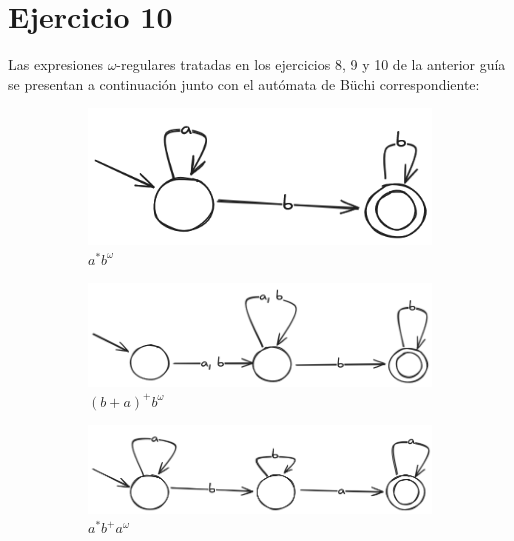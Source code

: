 \documentclass{article}
\begin{document}
\section*{Ejercicio 10}
Las expresiones $\omega$-regulares tratadas en los ejercicios 8, 9 y 10 de la anterior guía se presentan a continuación junto con el autómata de Büchi correspondiente:
\begin{figure}[!htb]
	\renewcommand\thesubfigure{\arabic{subfigure}}
	\centering
	\begin{subfigure}[b]{0.2\textwidth}
		\centering
		\includegraphics[width=\textwidth]{04-10-01.png}
		\caption{$a^*b^\omega$}
	\end{subfigure}
	\hfil
	\begin{subfigure}[b]{0.3\textwidth}
		\centering
		\includegraphics[width=\textwidth]{04-10-02.png}
		\caption{$(b + a)^+b^\omega$}
	\end{subfigure}
	\hfil
	\begin{subfigure}[b]{0.3\textwidth}
		\centering
		\includegraphics[width=\textwidth]{04-10-03.png}
		\caption{$a^*b^+a^\omega$}
	\end{subfigure}
	\hfil
	\begin{subfigure}[b]{0.3\textwidth}
		\centering

\end{subfigure}
\end{figure}
\end{document}
